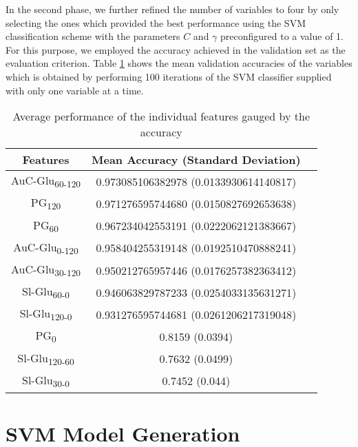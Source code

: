 \documentclass[journal,comsoc]{IEEEtran}
\renewcommand{\^}{\hat}  %
\begin{document}
In the second phase, we further refined the number of variables to four by only selecting the ones which provided the best performance using the SVM classification scheme with the parameters $C$ and $\gamma$ preconfigured to a value of \num{1}. For this purpose, we employed the accuracy achieved in the validation set as the evaluation criterion. Table \ref{tab:best_features} shows the mean validation accuracies of the variables which is  obtained by performing \num{100} iterations of the SVM classifier supplied with only one variable at a time.
%
\begin{table}[!htbp]
  \caption{Average performance of the individual features gauged by the accuracy}
  \centering
  \begin{tabular}{c c c}
    \toprule
    Features &  Mean Accuracy (Standard Deviation)\\
    \midrule \midrule
    \rowcolor{green!25} AuC-Glu\textsubscript{60-120}	& \num{0.973085106382978}	(\num{0.0133930614140817})\\
    \rowcolor{green!25} PG\textsubscript{120}	& \num{0.971276595744680}	(\num{0.0150827692653638})\\
    \rowcolor{green!25} PG\textsubscript{60}	& \num{0.967234042553191}	(\num{0.0222062121383667})\\
    \rowcolor{green!25} AuC-Glu\textsubscript{0-120}	& \num{0.958404255319148}	(\num{0.0192510470888241})\\
    AuC-Glu\textsubscript{30-120}	& \num{0.950212765957446}	(\num{0.0176257382363412}) \\
    Sl-Glu\textsubscript{60-0}	& \num{0.946063829787233}	(\num{0.0254033135631271})\\
    Sl-Glu\textsubscript{120-0}	& \num{0.931276595744681}	(\num{0.0261206217319048})\\
    PG\textsubscript{0}	& \num{0.8159}	(\num{0.0394})\\
    Sl-Glu\textsubscript{120-60}	& \num{0.7632}	(\num{0.0499})\\
    Sl-Glu\textsubscript{30-0}	& \num{0.7452}	(\num{0.044})\\
    \bottomrule
  \end{tabular}
  \label{tab:best_features}
\end{table}
%

\section{SVM Model Generation}
%
\end{document}
